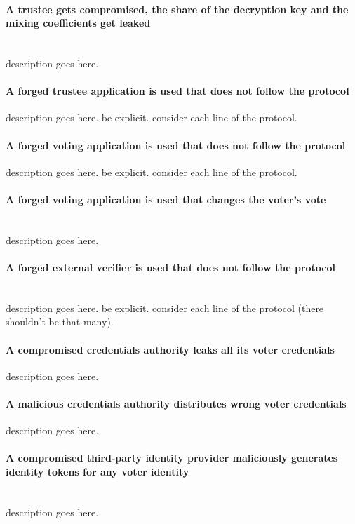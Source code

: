 \paragraph{A trustee gets compromised, the share of the decryption key and the mixing coefficients get leaked} \mbox{} \\
description goes here.


\paragraph{A forged trustee application is used that does not follow the protocol}
description goes here.
be explicit.
consider each line of the protocol.


\paragraph{A forged voting application is used that does not follow the protocol}
description goes here.
be explicit.
consider each line of the protocol.


\paragraph{A forged voting application is used that changes the voter's vote} \mbox{} \\
description goes here.


\paragraph{A forged external verifier is used that does not follow the protocol} \mbox{} \\
description goes here.
be explicit.
consider each line of the protocol (there shouldn't be that many).


\paragraph{A compromised credentials authority leaks all its voter credentials}
description goes here.


\paragraph{A malicious credentials authority distributes wrong voter credentials}
description goes here.


\paragraph{A compromised third-party identity provider maliciously generates identity tokens for any voter identity} \mbox{} \\
description goes here.


